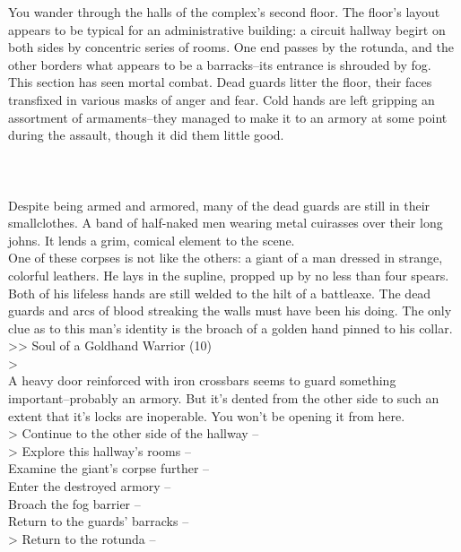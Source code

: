 You wander through the halls of the complex’s second floor. The floor's layout appears to be typical for an administrative building: a circuit hallway begirt on both sides by concentric series of rooms. One end passes by the rotunda, and the other borders what appears to be a barracks--its entrance is shrouded by fog.\\

This section has seen mortal combat. Dead guards litter the floor, their faces transfixed in various masks of anger and fear. Cold hands are left gripping an assortment of armaments--they managed to make it to an armory at some point during the assault, though it did them little good.\\
\\
\\
\\

Despite being armed and armored, many of the dead guards are still in their smallclothes. A band of half-naked men wearing metal cuirasses over their long johns. It lends a grim, comical element to the scene.\\

One of these corpses is not like the others: a giant of a man dressed in strange, colorful leathers. He lays in the supline, propped up by no less than four spears. Both of his lifeless hands are still welded to the hilt of a battleaxe. The dead guards and arcs of blood streaking the walls must have been his doing. The only clue as to this man's identity is the broach of a golden hand pinned to his collar.\\
>> Soul of a Goldhand Warrior (10)\\
>\\

A heavy door reinforced with iron crossbars seems to guard something important--probably an armory. But it's dented from the other side to such an extent that it's locks are inoperable. You won't be opening it from here.\\

> Continue to the other side of the hallway -- \\
> Explore this hallway's rooms -- \\
 Examine the giant's corpse further -- \\
 Enter the destroyed armory -- \\
 Broach the fog barrier -- \\
 Return to the guards' barracks -- \\
> Return to the rotunda -- 